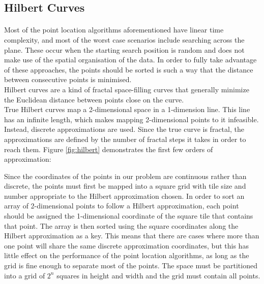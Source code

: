 \subsection{Hilbert Curves}
\paragraph{}
Most of the point location algorithms aforementioned have linear time complexity, and most of the worst case scenarios include searching across the plane. These occur when the starting search position is random and does not make use of the spatial organisation of the data. In order to fully take advantage of these approaches, the points should be sorted is such a way that the distance between consecutive points is minimised.\\
Hilbert curves are a kind of fractal space-filling curves \cite{sfcurves} that generally minimize the Euclidean distance between points close on the curve.\\
True Hilbert curves map a 2-dimensional space in a 1-dimension line. This line has an infinite length, which makes mapping 2-dimensional points to it infeasible. Instead, discrete approximations are used. Since the true curve is fractal, the approximations are defined by the number of fractal steps it takes in order to reach them. Figure \ref*{fig:hilbert} demonstrates the first few orders of approximation:

\noindent
Since the coordinates of the points in our problem are continuous rather than discrete, the points must first be mapped into a square grid with tile size and number appropriate to the Hilbert approximation chosen.
In order to sort an array of 2-dimensional points to follow a Hilbert approximation, each point should be assigned the 1-dimensional coordinate of the square tile that contains that point. The array is then sorted using the square coordinates along the Hilbert approximation as a key.
This means that there are cases where more than one point will share the same discrete approximation coordinates, but this has little effect on the performance of the point location algorithms, as long as the grid is fine enough to separate most of the points. The space must be partitioned into a grid of $2^n$ squares in height and width and the grid must contain all points.











